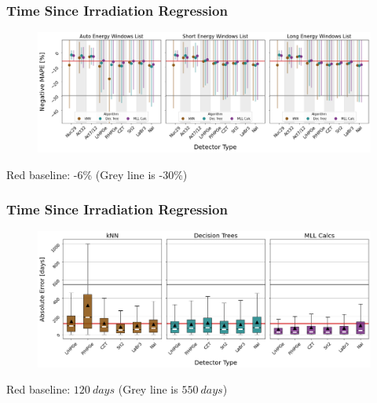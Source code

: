 \begin{frame}
  \frametitle{Time Since Irradiation Regression}
  \begin{adjustwidth}{-15pt}{-10pt}
  \begin{figure}
    \centering
    \includegraphics[width=1.1\textwidth]{./figures/detector_preds_wrt_enlist_MAPE_cool.png}
  \end{figure}
  \vspace{12pt} \centering Red baseline: -6\% (Grey line is -30\%) 
  \end{adjustwidth}
\end{frame}

\begin{frame}
  \frametitle{Time Since Irradiation Regression}
  \begin{adjustwidth}{-15pt}{-10pt}
  \begin{figure}
    \centering
    \includegraphics[width=1.1\textwidth]{./figures/abserror_boxplots_auto_cool.png}
  \end{figure}
  \vspace{12pt} \centering Red baseline: $120\:days$ (Grey line is $550\:days$) 
  \end{adjustwidth}
\end{frame}

